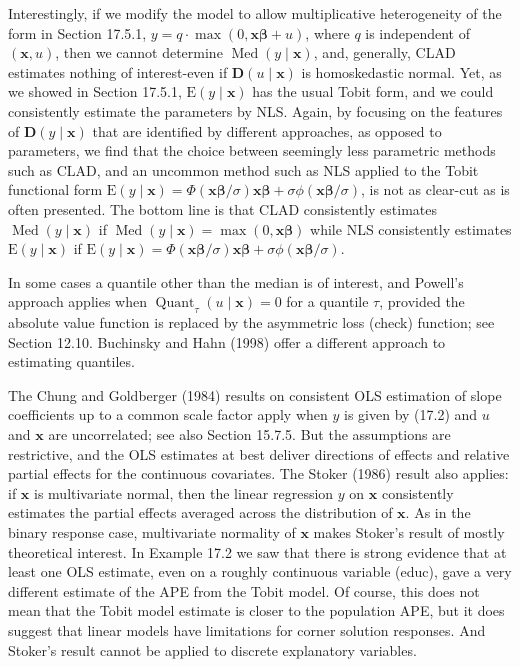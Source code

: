 \documentclass[10pt]{article}
\begin{document}
Interestingly, if we modify the model to allow multiplicative heterogeneity of the form in Section 17.5.1, $y=q \cdot \max (0, \mathbf{x} \boldsymbol{\beta}+u)$, where $q$ is independent of $(\mathbf{x}, u)$, then we cannot determine $\operatorname{Med}(y \mid \mathbf{x})$, and, generally, CLAD estimates nothing of interest-even if $\mathbf{D}(u \mid \mathbf{x})$ is homoskedastic normal. Yet, as we showed in Section 17.5.1, $\mathrm{E}(y \mid \mathbf{x})$ has the usual Tobit form, and we could consistently estimate the parameters by NLS. Again, by focusing on the features of $\mathbf{D}(y \mid \mathbf{x})$ that are identified by different approaches, as opposed to parameters, we find that the choice between seemingly less parametric methods such as CLAD, and an uncommon method such as NLS applied to the Tobit functional form $\mathrm{E}(y \mid \mathbf{x})=\Phi(\mathbf{x} \boldsymbol{\beta} / \sigma) \mathbf{x} \boldsymbol{\beta}+\sigma \phi(\mathbf{x} \boldsymbol{\beta} / \sigma)$, is not as clear-cut as is often presented. The bottom line is that CLAD consistently estimates $\operatorname{Med}(y \mid \mathbf{x})$ if $\operatorname{Med}(y \mid \mathbf{x})=\max (0, \mathbf{x} \boldsymbol{\beta})$ while NLS consistently estimates $\mathrm{E}(y \mid \mathbf{x})$ if $\mathrm{E}(y \mid \mathbf{x})=\Phi(\mathbf{x} \boldsymbol{\beta} / \sigma) \mathbf{x} \boldsymbol{\beta}+\sigma \phi(\mathbf{x} \boldsymbol{\beta} / \sigma)$.

In some cases a quantile other than the median is of interest, and Powell's approach applies when $\operatorname{Quant}_{\tau}(u \mid \mathbf{x})=0$ for a quantile $\tau$, provided the absolute value function is replaced by the asymmetric loss (check) function; see Section 12.10. Buchinsky and Hahn (1998) offer a different approach to estimating quantiles.

The Chung and Goldberger (1984) results on consistent OLS estimation of slope coefficients up to a common scale factor apply when $y$ is given by (17.2) and $u$ and $\mathbf{x}$ are uncorrelated; see also Section 15.7.5. But the assumptions are restrictive, and the OLS estimates at best deliver directions of effects and relative partial effects for the continuous covariates. The Stoker (1986) result also applies: if $\mathbf{x}$ is multivariate normal, then the linear regression $y$ on $\mathbf{x}$ consistently estimates the partial effects averaged across the distribution of $\mathbf{x}$. As in the binary response case, multivariate normality of $\mathbf{x}$ makes Stoker's result of mostly theoretical interest. In Example 17.2 we saw that there is strong evidence that at least one OLS estimate, even on a roughly continuous variable (educ), gave a very different estimate of the APE from the Tobit model. Of course, this does not mean that the Tobit model estimate is closer to the population APE, but it does suggest that linear models have limitations for corner solution responses. And Stoker's result cannot be applied to discrete explanatory variables.
\end{document}
